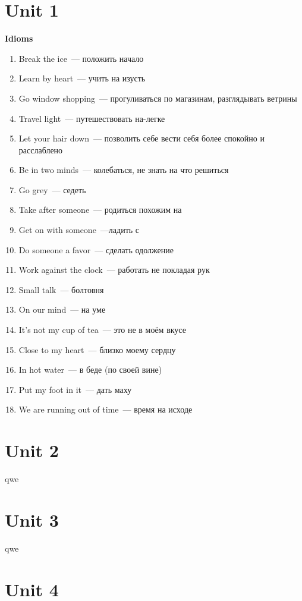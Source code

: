 \documentclass[10pt,a4paper]{article}
\begin{document}
\section{Unit 1}
\textbf{Idioms}

\begin{enumerate}
 \item Break the ice~--- положить начало 
 \item Learn by heart~--- учить на изусть
 \item Go window shopping~--- прогуливаться по магазинам, разглядывать ветрины
 \item Travel light~--- путешествовать на-легке
 \item Let your hair down~--- позволить себе вести себя более спокойно и расслаблено
 \item Be in two minds~--- колебаться, не знать на что решиться
 \item Go grey~--- седеть
 \item Take after someone~--- родиться похожим на
 \item Get on with someone~---ладить с 
 \item Do someone a favor~--- сделать одолжение
 \item Work against the clock~--- работать не покладая рук
 \item Small talk~--- болтовня
 \item On our mind~--- на уме
 \item It's not my cup of tea~--- это не в моём вкусе
 \item Close to my heart~--- близко моему сердцу
 \item In hot water~--- в беде (по своей вине)
 \item Put my foot in it~--- дать маху
 \item We are running out of time~--- время на исходе
\end{enumerate}



\section{Unit 2}
qwe



\section{Unit 3}
qwe



\section{Unit 4}
\end{document}
